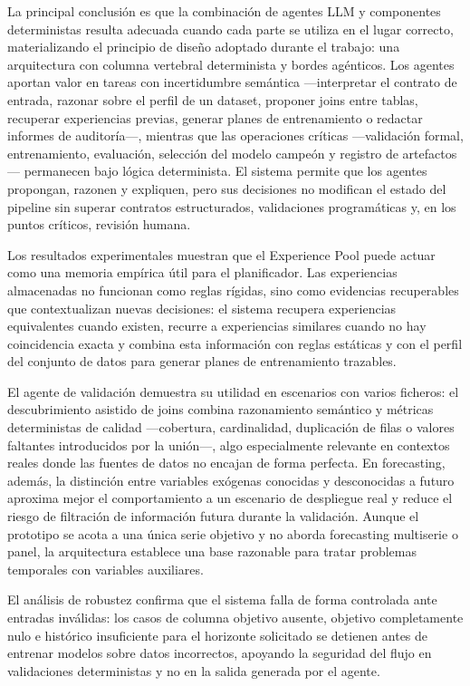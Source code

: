 \documentclass[12pt,a4paper]{article}
\theoremstyle{plain}
\begin{document}
La principal conclusión es que la combinación de agentes LLM y componentes deterministas resulta adecuada cuando cada parte se utiliza en el lugar correcto, materializando el principio de diseño adoptado durante el trabajo: una arquitectura con columna vertebral determinista y bordes agénticos. Los agentes aportan valor en tareas con incertidumbre semántica ---interpretar el contrato de entrada, razonar sobre el perfil de un dataset, proponer joins entre tablas, recuperar experiencias previas, generar planes de entrenamiento o redactar informes de auditoría---, mientras que las operaciones críticas ---validación formal, entrenamiento, evaluación, selección del modelo campeón y registro de artefactos--- permanecen bajo lógica determinista. El sistema permite que los agentes propongan, razonen y expliquen, pero sus decisiones no modifican el estado del pipeline sin superar contratos estructurados, validaciones programáticas y, en los puntos críticos, revisión humana.

Los resultados experimentales muestran que el Experience Pool puede actuar como una memoria empírica útil para el planificador. Las experiencias almacenadas no funcionan como reglas rígidas, sino como evidencias recuperables que contextualizan nuevas decisiones: el sistema recupera experiencias equivalentes cuando existen, recurre a experiencias similares cuando no hay coincidencia exacta y combina esta información con reglas estáticas y con el perfil del conjunto de datos para generar planes de entrenamiento trazables. %

El agente de validación demuestra su utilidad en escenarios con varios ficheros: el descubrimiento asistido de joins combina razonamiento semántico y métricas deterministas de calidad ---cobertura, cardinalidad, duplicación de filas o valores faltantes introducidos por la unión---, algo especialmente relevante en contextos reales donde las fuentes de datos no encajan de forma perfecta. En forecasting, además, la distinción entre variables exógenas conocidas y desconocidas a futuro aproxima mejor el comportamiento a un escenario de despliegue real y reduce el riesgo de filtración de información futura durante la validación. Aunque el prototipo se acota a una única serie objetivo y no aborda forecasting multiserie o panel, la arquitectura establece una base razonable para tratar problemas temporales con variables auxiliares.

El análisis de robustez confirma que el sistema falla de forma controlada ante entradas inválidas: los casos de columna objetivo ausente, objetivo completamente nulo e histórico insuficiente para el horizonte solicitado se detienen antes de entrenar modelos sobre datos incorrectos, apoyando la seguridad del flujo en validaciones deterministas y no en la salida generada por el agente.
\end{document}
